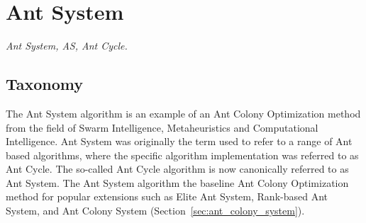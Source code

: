 

\section{Ant System} 
\label{sec:ant_system}

\emph{Ant System, AS, Ant Cycle.}

\subsection{Taxonomy}
The Ant System algorithm is an example of an Ant Colony Optimization method from the field of Swarm Intelligence, Metaheuristics and Computational Intelligence.
Ant System was originally the term used to refer to a range of Ant based algorithms, where the specific algorithm implementation was referred to as Ant Cycle. The so-called Ant Cycle algorithm is now canonically referred to as Ant System. The Ant System algorithm the baseline Ant Colony Optimization method for popular extensions such as Elite Ant System, Rank-based Ant System, and Ant Colony System (Section~\ref{sec:ant_colony_system}).

